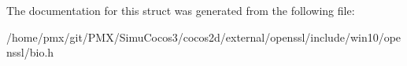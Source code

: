 The documentation for this struct was generated from the following file\+:\begin{DoxyCompactItemize}
\item 
/home/pmx/git/\+P\+M\+X/\+Simu\+Cocos3/cocos2d/external/openssl/include/win10/openssl/bio.\+h\end{DoxyCompactItemize}

